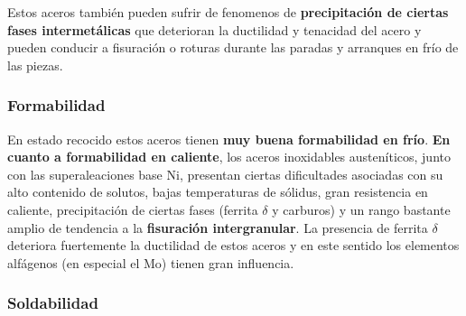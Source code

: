 Estos aceros también pueden sufrir de fenomenos de \textbf{precipitación de ciertas fases intermetálicas} que deterioran la ductilidad y tenacidad del acero y pueden conducir a fisuración o roturas durante las paradas y arranques en frío de las piezas.

\subsubsection{Formabilidad}
En estado recocido estos aceros tienen \textbf{muy buena formabilidad en frío}. \textbf{En cuanto a formabilidad en caliente}, los aceros inoxidables austeníticos, junto con las superaleaciones base Ni, presentan ciertas dificultades asociadas con su alto contenido de solutos, bajas temperaturas de sólidus, gran resistencia en caliente, precipitación de ciertas fases (ferrita $\delta$ y carburos) y un rango bastante amplio de tendencia a la \textbf{fisuración intergranular}. La presencia de ferrita $\delta$ deteriora fuertemente la ductilidad de estos aceros y en este sentido los elementos alfágenos (en especial el Mo) tienen gran influencia.


\subsubsection{Soldabilidad}





